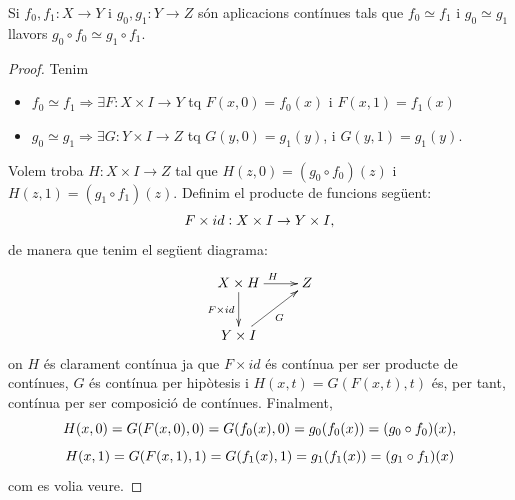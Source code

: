 \documentclass[../main.tex]{subfiles}
\begin{document}
\begin{prop}
[Exercici 1.2.a]\label{exercici1.2.a} Si $f_0,f_1:X\rightarrow Y$ i $g_0,g_1:Y\rightarrow Z$ són aplicacions contínues tals que $f_0\simeq f_1$ i $g_0\simeq g_1$ llavors $g_0\circ f_0\simeq g_1\circ f_1$.
\end{prop}
\begin{proof}
Tenim
\begin{itemize}
    \item $f_0\simeq f_1\Longrightarrow \exists F:X\times I\rightarrow Y$ tq $F(x,0)=f_0(x)$ i $F(x,1) = f_1(x)$
    \item $g_0\simeq g_1\Longrightarrow \exists G:Y\times I\rightarrow Z$ tq $G(y,0) = g_1(y)$, i $G(y,1)=g_1(y)$.
\end{itemize}
Volem troba $H:X\times I\rightarrow Z$ tal que $H(z,0)=(g_0\circ f_0)(z)$ i $H(z,1) = (g_1\circ f_1)(z)$. Definim el producte de funcions següent:
\begin{equation}
    \notag
    F\times id:X\times I\rightarrow Y\times I,
\end{equation}
de manera que tenim el següent diagrama:
\begin{equation}
        \notag
        \xymatrix{
            X\times H\ar[d]_{F\times id} \ar[r]^{H} & Z \\
            Y\times I \ar[ur]_G
        }
    \end{equation}
    on $H$ és clarament contínua ja que $F\times id$ és contínua per ser producte de contínues, $G$ és contínua per hipòtesis i $H(x,t) = G(F(x,t),t)$ és, per tant, contínua per ser composició de contínues. Finalment,
    \begin{equation}
        \notag
        H(x,0) = G(F(x,0),0) = G(f_0(x),0) = g_0(f_0(x)) = (g_0\circ f_0)(x), 
    \end{equation}
    \begin{equation}
        \notag
        H(x,1) = G(F(x,1),1) = G(f_1(x),1) = g_1(f_1(x)) = (g_1\circ f_1)(x)
    \end{equation}
    com es volia veure.
\end{proof}
\end{document}
